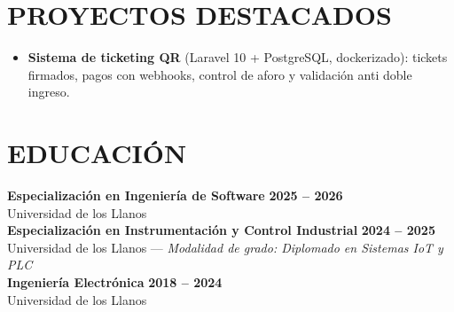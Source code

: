 \documentclass[letterpaper,10pt]{article}
\begin{document}
\section{PROYECTOS DESTACADOS}
\begin{itemize}
    \item \textbf{Sistema de ticketing QR} (Laravel 10 + PostgreSQL, dockerizado): tickets firmados, pagos con webhooks, control de aforo y validación anti doble ingreso.
\end{itemize}

\section{EDUCACIÓN}
\textbf{Especialización en Ingeniería de Software} \hfill \textbf{2025 -- 2026} \\
Universidad de los Llanos \\
\textbf{Especialización en Instrumentación y Control Industrial} \hfill \textbf{2024 -- 2025} \\
Universidad de los Llanos --- \textit{Modalidad de grado: Diplomado en Sistemas IoT y PLC} \\
\textbf{Ingeniería Electrónica} \hfill \textbf{2018 -- 2024} \\
Universidad de los Llanos

\end{document}
